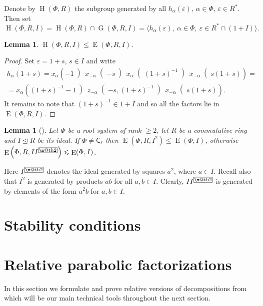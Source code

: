 \documentclass[12pt]{amsart}
\makeatletter
\numberwithin{equation}{section}
\newtheorem{lemma}[lemmacounter]{Lemma}
\theoremstyle{definition}
\DeclareMathOperator{\G}{G}
\DeclareMathOperator{\E}{E}
\DeclareMathOperator{\Hh}{H}
\newcommand{\rC}{\mathsf{C}}
\newcommand{\indexbox}[1]{\text{\fboxsep=.1em\fbox{\m@th$\displaystyle#1$}}}
\makeatother
\begin{document}
Denote by $\Hh(\Phi,R)$ the subgroup generated by all $h_\alpha(\varepsilon)$, $\alpha\in\Phi$, $\varepsilon\in R^*$. Then set
\[ \Hh(\Phi,R,I) = \Hh(\Phi,R)\cap\G(\Phi,R,I)=\langle h_\alpha(\varepsilon),\ \alpha\in\Phi,\ \varepsilon\in R^*\cap(1+I)\rangle. \]
\begin{lemma}\label{lemma:rel-tor-elementary}
$\Hh(\Phi,R,I)\leqslant\E(\Phi,R,I)$.
\end{lemma}
\begin{proof}
Set $\varepsilon=1+s$, $s\in I$ and write
\begin{multline*}
h_\alpha(1+s) = x_\alpha\left(-1\middle)\, x_{-\alpha}\middle(-s\middle)\, x_\alpha\middle((1+s)^{-1}\middle)\, x_{-\alpha}\middle(s(1+s)\right) = \\
= x_\alpha\left((1+s)^{-1}-1\middle)\, z_{-\alpha}\middle(-s,(1+s)^{-1}\middle)\, x_{-\alpha}\middle(s(1+s)\right).
\end{multline*}
It remains to note that $(1+s)^{-1}\in 1+I$ and so all the factors lie in $\E(\Phi,R,I)$.
\end{proof}

\begin{lemma}[{\cite[Corollary~3.3]{S}}]\label{lemma:Stepanov-ideal}
Let $\Phi$ be a root system of rank $\geqslant2$, let $R$ be a commutative ring and $I\trianglelefteq R$ be its ideal.
If $\Phi\neq\rC_\ell$ then $\E\left(\Phi,R,I^2\right)\leqslant\E(\Phi,I)$, otherwise $\E\left(\Phi,R,II^{\indexbox{2}}\right)\leqslant\E(\Phi,I)$.
\end{lemma}
Here $I^{\indexbox{2}}$ denotes the ideal generated by squares $a^2$, where $a\in I$.
Recall also that $I^2$ is generated by products $ab$ for all $a,b\in I$.
Clearly, $II^{\indexbox{2}}$ is generated by elements of the form $a^2b$ for $a,b\in I$.


\section{Stability conditions}\label{sec:stability-conditions}


\section{Relative parabolic factorizations} \label{sec:factorizations}
In this section we formulate and prove relative versions of decompositions from~\cite{St78} which will be our main technical tools throughout the next section.
\end{document}
